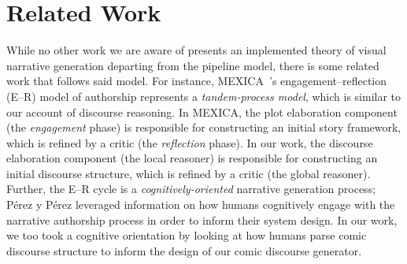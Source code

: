\section{Related Work}


While no other work we are aware of presents an implemented theory of
visual narrative generation departing from the pipeline model, there is
some related work that follows said model.
%
%
For instance, MEXICA~\cite{perez2001mexica}'s
engagement--reflection (E--R) model of authorship represents a
\emph{tandem-process model}, which is similar to our account of discourse
reasoning. In MEXICA, the plot elaboration component (the \emph{engagement}
phase) is responsible for constructing an initial story framework, which is
refined by a critic (the \emph{reflection} phase). In our work, the
discourse elaboration component (the local reasoner) is responsible for
constructing an initial discourse structure, which is refined by a critic
(the global reasoner).  Further, the E--R cycle is a
\emph{cognitively-oriented} narrative generation process; P\'erez y P\'erez
leveraged information on how humans cognitively engage with the narrative
authorship process in order to inform their system design. In our work, we
too took a cognitive orientation by looking at how humans parse comic
discourse structure to inform the design of our comic discourse generator.

